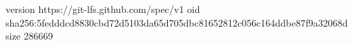 version https://git-lfs.github.com/spec/v1
oid sha256:5fedddcd8830cbd72d5103da65d705dbc81652812c056c164ddbe87f9a32068d
size 286669

